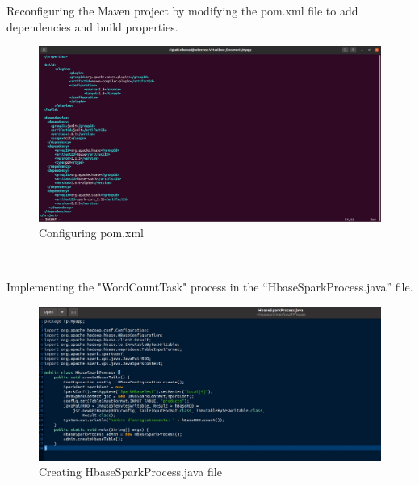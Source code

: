 \begin{spacing}{1.2}
\par Reconfiguring the Maven project by modifying the pom.xml file to add dependencies and build properties.
\\
\begin{figure}[!htb] 
\begin{center} 
\includegraphics[width=1\linewidth]{Pictures/HBase/Data processing with Spark/Preparation of the environment/Configuring pom.xml} 
\end{center} 
\caption{Configuring pom.xml} 
\end{figure}  \FloatBarrier
\\
\newpage
\par Implementing the "WordCountTask" process in the “HbaseSparkProcess.java” file.
\\
\begin{figure}[!htb] 
\begin{center} 
\includegraphics[width=1\linewidth]{Pictures/HBase/Data processing with Spark/Preparation of the environment/Creating HbaseSparkProcess.java file} 
\end{center} 
\caption{Creating HbaseSparkProcess.java file} 
\end{figure}  \FloatBarrier
\\


\end{spacing}
